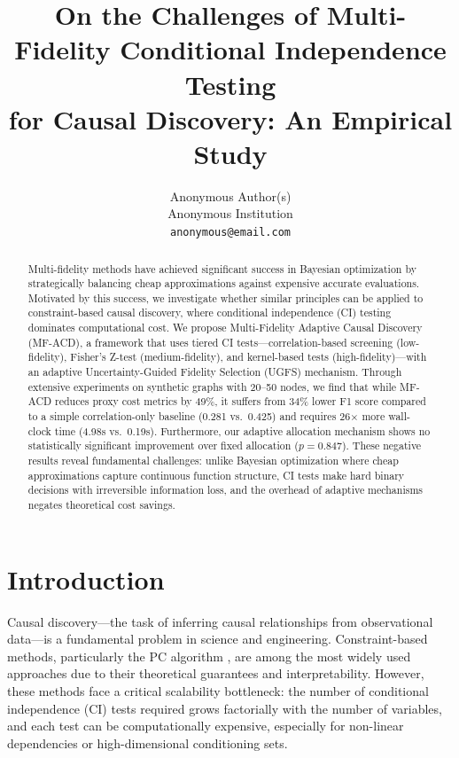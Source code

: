 \documentclass{article}
\title{On the Challenges of Multi-Fidelity Conditional Independence Testing \\
for Causal Discovery: An Empirical Study}
\author{%
  Anonymous Author(s) \\
  Anonymous Institution \\
  \texttt{anonymous@email.com}
}
\begin{document}
\maketitle

\begin{abstract}
Multi-fidelity methods have achieved significant success in Bayesian optimization by strategically balancing cheap approximations against expensive accurate evaluations. Motivated by this success, we investigate whether similar principles can be applied to constraint-based causal discovery, where conditional independence (CI) testing dominates computational cost. We propose Multi-Fidelity Adaptive Causal Discovery (MF-ACD), a framework that uses tiered CI tests---correlation-based screening (low-fidelity), Fisher's Z-test (medium-fidelity), and kernel-based tests (high-fidelity)---with an adaptive Uncertainty-Guided Fidelity Selection (UGFS) mechanism. Through extensive experiments on synthetic graphs with 20--50 nodes, we find that while MF-ACD reduces proxy cost metrics by 49\%, it suffers from 34\% lower F1 score compared to a simple correlation-only baseline (0.281 vs.~0.425) and requires 26$\times$ more wall-clock time (4.98s vs.~0.19s). Furthermore, our adaptive allocation mechanism shows no statistically significant improvement over fixed allocation ($p = 0.847$). These negative results reveal fundamental challenges: unlike Bayesian optimization where cheap approximations capture continuous function structure, CI tests make hard binary decisions with irreversible information loss, and the overhead of adaptive mechanisms negates theoretical cost savings.
\end{abstract}

\section{Introduction}

Causal discovery---the task of inferring causal relationships from observational data---is a fundamental problem in science and engineering. Constraint-based methods, particularly the PC algorithm \citep{spirtes2000causation}, are among the most widely used approaches due to their theoretical guarantees and interpretability. However, these methods face a critical scalability bottleneck: the number of conditional independence (CI) tests required grows factorially with the number of variables, and each test can be computationally expensive, especially for non-linear dependencies or high-dimensional conditioning sets.
\end{document}

